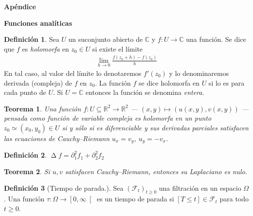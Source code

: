 \documentclass{article}
\newcommand{\events}{\mathcal{F}}
\newcommand{\realNumbers}{\mathbb{R}}
\newcommand{\complexNumbers}{\mathbb{C}}
\DeclareMathOperator{\laplacian}{\Delta}
\theoremstyle{plain}
\newtheorem{theorem}{Teorema}
\theoremstyle{remark}
\theoremstyle{definition}
\newtheorem{definition}{Definición}
\begin{document}

\newpage
{\huge \textbf{Apéndice}}


\textbf{Funciones analíticas}
\begin{definition}
  Sea \(U\) un suconjunto abierto de \(\complexNumbers\) y \(f : U \rightarrow \complexNumbers\) una función.
  Se dice que \(f\) es \emph{holomorfa} en \(z_0 \in U\) si existe el límite
  \begin{align}
    \lim_{h \rightarrow 0} \frac{f(z_0 + h) - f(z_0)}{h}
  \end{align}
  En tal caso, al valor del límite lo denotaremos \(f'(z_0)\) y lo denominaremos derivada (compleja) de \(f\) en \(z_0\).
  La función \(f\) se dice holomorfa en \(U\) si lo es para cada punto de \(U\).
  Si \(U = \complexNumbers\) entonces la función se denomina \emph{entera}.
\end{definition}

\begin{theorem}
  Una función \(f : U \subseteq \realNumbers^2 \rightarrow \realNumbers^2\) --- \((x, y) \mapsto (u(x, y), v(x, y))\) --- pensada como función de variable compleja es holomorfa en un punto \(z_0 \simeq (x_0, y_0) \in U\) si y sólo si es diferenciable y sus derivadas parciales satisfacen las ecuaciones de Cauchy--Riemann \(u_x = v_y\), \(u_y = - v_x\).
\end{theorem}


\begin{definition}
  \(\laplacian f = \partial_1^2 f_1 + \partial_2^2 f_2\)
\end{definition}

\begin{theorem}
  Si \(u, v\) satisfacen Cauchy--Riemann, entonces su Laplaciano es nulo.
\end{theorem}



\begin{definition}[Tiempo de parada.]
Sea \((\events_t)_{t \geq 0}\) una filtración en un espacio \(\Omega\).
Una función \(\tau : \Omega \rightarrow \left[ 0, \infty \right[\) es un tiempo de parada si \([T \leq t] \in \events_t\) para todo \(t \geq 0\).
\end{definition}
\end{document}
